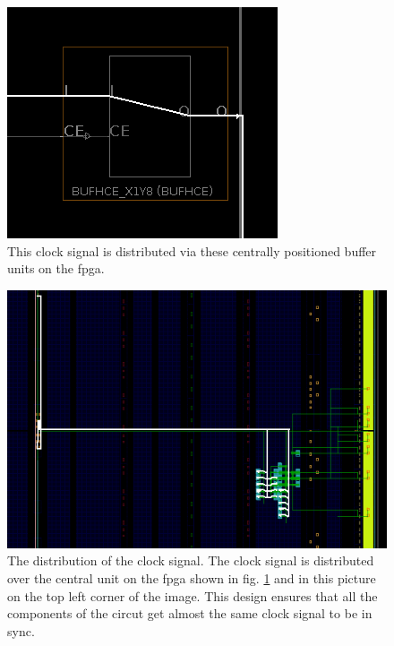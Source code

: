 \begin{figure}[h]
	\centering
	\includegraphics[width=.6\linewidth]{./L3/E3/BUFHCE.png}
	\caption{This clock signal is distributed via these centrally positioned buffer units on the \gls{fpga}.} 
	\label{fig: clock  e_3_3_1}
\end{figure}

\begin{figure}[h]
	\centering
	\includegraphics[width=.8\linewidth]{./L3/E3/CLK.png}
	\caption{The distribution of the clock signal. The clock signal is distributed over the central unit on the \gls{fpga} shown in fig. \ref*{fig: clock  e_3_3_1} and in this picture on the top left corner of the image. This design ensures that all the components of the circut get almost the same clock signal to be in sync.}
	\label{fig: clock routing e_3_3_1}
\end{figure}







